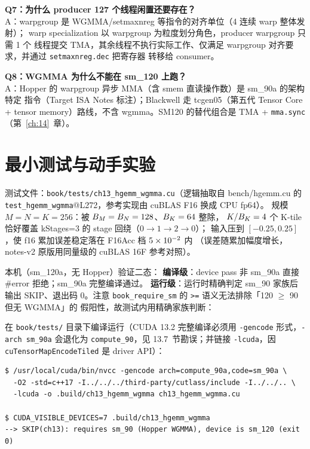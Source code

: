 \textbf{Q7：为什么 producer 127 个线程闲置还要存在？}\\
A：warpgroup 是 WGMMA/setmaxnreg 等指令的对齐单位（4 连续 warp 整体发射）；
warp specialization 以 warpgroup 为粒度划分角色，producer warpgroup 只需 1 个
线程提交 TMA，其余线程不执行实际工作、仅满足 warpgroup 对齐要求，并通过 \texttt{setmaxnreg.\allowbreak{}dec} 把寄存器
转移给 consumer。

\textbf{Q8：WGMMA 为什么不能在 sm\_120 上跑？}\\
A：Hopper 的 warpgroup 异步 MMA（含 smem 直读操作数）是 sm\_90a 的架构特定
指令（Target ISA Notes 标注）；Blackwell 走 tcgen05（第五代 Tensor Core +
tensor memory）路线，不含 wgmma。SM120 的替代组合是 TMA + \texttt{mma.sync}
（第~\ref{ch:14}~章）。

\section{最小测试与动手实验}

测试文件：\texttt{book/\allowbreak{}tests/\allowbreak{}ch13\_\allowbreak{}hgemm\_\allowbreak{}wgmma.cu}（逻辑抽取自 bench/hgemm.cu 的
\texttt{test\_\allowbreak{}hgemm\_\allowbreak{}wgmma}@L272，参考实现由 cuBLAS F16 换成 CPU fp64）。
规模 $M = N = K = 256$：被 $B\sb{M} = B\sb{N} = 128$、$B\sb{K} = 64$ 整除，
$K / B\sb{K} = 4$ 个 K-tile 恰好覆盖 kStages=3 的 stage 回绕（$0 \to 1 \to 2 \to 0$）；
输入压到 $[-0.25, 0.25]$，使 f16 累加误差稳定落在 F16Acc 档 $5 \times 10\sp{-2}$ 内
（误差随累加幅度增长，notes-v2 原版用同量级的 cuBLAS 16F 参考对照）。

本机（sm\_120a，无 Hopper）验证二态：
\textbf{编译级}：device pass 非 sm\_90a 直接 \#error 拒绝；sm\_90a 完整编译通过。
\textbf{运行级}：运行时精确判定 sm\_90 家族后输出 SKIP、退出码 0。注意
\texttt{book\_\allowbreak{}require\_\allowbreak{}sm} 的 \texttt{>=} 语义无法排除「120 $\ge$ 90 但无 WGMMA」的
假阳性，故测试内用精确家族判断：

在 \texttt{book/tests/} 目录下编译运行（CUDA 13.2 完整编译必须用 \texttt{-gencode}
形式，\texttt{-arch sm\_90a} 会退化为 \texttt{compute\_90}，见 13.7~节勘误；并链接
\texttt{-lcuda}，因 \texttt{cu\allowbreak{}Tensor\allowbreak{}Map\allowbreak{}Encode\allowbreak{}Tiled} 是 driver API）：

\begin{lstlisting}[style=console]
$ /usr/local/cuda/bin/nvcc -gencode arch=compute_90a,code=sm_90a \
  -O2 -std=c++17 -I../../../third-party/cutlass/include -I../../.. \
  -lcuda -o .build/ch13_hgemm_wgmma ch13_hgemm_wgmma.cu

$ CUDA_VISIBLE_DEVICES=7 .build/ch13_hgemm_wgmma
--> SKIP(ch13): requires sm_90 (Hopper WGMMA), device is sm_120 (exit 0)
\end{lstlisting}

